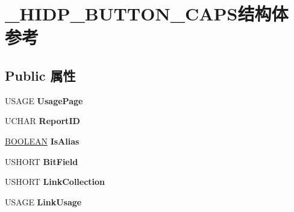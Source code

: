 \hypertarget{struct___h_i_d_p___b_u_t_t_o_n___c_a_p_s}{}\section{\+\_\+\+H\+I\+D\+P\+\_\+\+B\+U\+T\+T\+O\+N\+\_\+\+C\+A\+P\+S结构体 参考}
\label{struct___h_i_d_p___b_u_t_t_o_n___c_a_p_s}
\subsection*{Public 属性}
\begin{DoxyCompactItemize}
\item 
\mbox{\label{struct___h_i_d_p___b_u_t_t_o_n___c_a_p_s_afe936af479eb39e9d9023d04b3dd438d}} 
U\+S\+A\+GE {\bfseries Usage\+Page}
\item 
\mbox{\label{struct___h_i_d_p___b_u_t_t_o_n___c_a_p_s_a752e89a1da8f2ebc3234f0056df963b7}} 
U\+C\+H\+AR {\bfseries Report\+ID}
\item 
\mbox{\label{struct___h_i_d_p___b_u_t_t_o_n___c_a_p_s_a5d6b742a2a45831c22098c7c6f0de955}} 
\hyperlink{_processor_bind_8h_a112e3146cb38b6ee95e64d85842e380a}{B\+O\+O\+L\+E\+AN} {\bfseries Is\+Alias}
\item 
\mbox{\label{struct___h_i_d_p___b_u_t_t_o_n___c_a_p_s_a7bae41ce170034908bebcade7b156fc9}} 
U\+S\+H\+O\+RT {\bfseries Bit\+Field}
\item 
\mbox{\label{struct___h_i_d_p___b_u_t_t_o_n___c_a_p_s_a280692592d97306c7ca7bd1dedc9cc5a}} 
U\+S\+H\+O\+RT {\bfseries Link\+Collection}
\item 
\mbox{\label{struct___h_i_d_p___b_u_t_t_o_n___c_a_p_s_aa8f547475028c979c0e344f867a6e8a8}} 
U\+S\+A\+GE {\bfseries Link\+Usage}
\item 
\mbox{\label{struct___h_i_d_p___b_u_t_t_o_n___c_a_p_s_a1f75b0feccbf85ce0a8bad62c76bd73b}} 

\end{DoxyCompactItemize}
